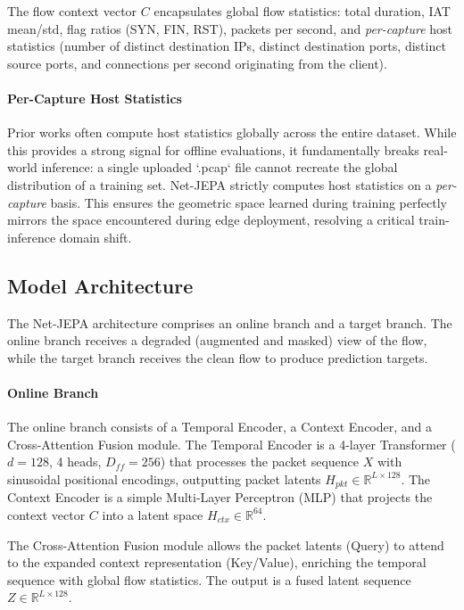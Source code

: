 \documentclass{article}
\begin{document}
The flow context vector $C$ encapsulates global flow statistics: total duration, IAT mean/std, flag ratios (SYN, FIN, RST), packets per second, and \textit{per-capture} host statistics (number of distinct destination IPs, distinct destination ports, distinct source ports, and connections per second originating from the client).

\paragraph{Per-Capture Host Statistics}
Prior works often compute host statistics globally across the entire dataset. While this provides a strong signal for offline evaluations, it fundamentally breaks real-world inference: a single uploaded `.pcap` file cannot recreate the global distribution of a training set. Net-JEPA strictly computes host statistics on a \textit{per-capture} basis. This ensures the geometric space learned during training perfectly mirrors the space encountered during edge deployment, resolving a critical train-inference domain shift.

\subsection{Model Architecture}

The Net-JEPA architecture comprises an online branch and a target branch. The online branch receives a degraded (augmented and masked) view of the flow, while the target branch receives the clean flow to produce prediction targets.

\paragraph{Online Branch}
The online branch consists of a Temporal Encoder, a Context Encoder, and a Cross-Attention Fusion module. The Temporal Encoder is a 4-layer Transformer ($d=128$, 4 heads, $D_{ff}=256$) that processes the packet sequence $X$ with sinusoidal positional encodings, outputting packet latents $H_{pkt} \in \mathbb{R}^{L \times 128}$. The Context Encoder is a simple Multi-Layer Perceptron (MLP) that projects the context vector $C$ into a latent space $H_{ctx} \in \mathbb{R}^{64}$.

The Cross-Attention Fusion module allows the packet latents (Query) to attend to the expanded context representation (Key/Value), enriching the temporal sequence with global flow statistics. The output is a fused latent sequence $Z \in \mathbb{R}^{L \times 128}$.
\end{document}
